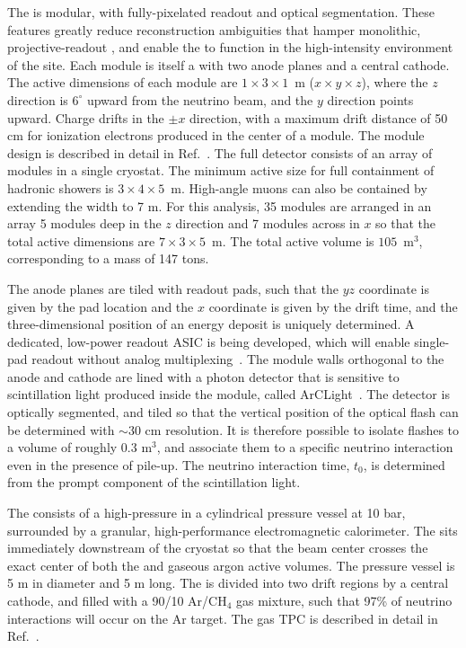 The  is modular, with fully-\threed  pixelated readout and optical segmentation. These features greatly reduce reconstruction ambiguities that hamper monolithic, projective-readout , and enable the  to function in the high-intensity environment of the   site. Each module is itself a   with two anode planes and a central cathode. The active dimensions of each module are $1 \times 3 \times 1$~m ($x \times y \times z$), where the $z$ direction is $6^{\circ}$ upward from the neutrino beam, and the $y$ direction points upward. Charge drifts in the $\pm x$ direction, with a maximum drift distance of 50 cm for ionization electrons produced in the center of a module. The module design is described in detail in Ref.~\cite{Asaadi:2018xfh}. The full  detector consists of an array of modules in a single cryostat. The minimum active size for full containment of hadronic showers is $3 \times 4 \times 5$~m. High-angle muons can also be contained by extending the width to 7 m. For this analysis, 35 modules are arranged in an array 5 modules deep in the $z$ direction and 7 modules across in $x$ so that the total active dimensions are $7 \times 3 \times 5$~m. The total active  volume is $105$~m$^{3}$, corresponding to a mass of 147 tons.

The anode planes are tiled with readout pads, such that the $yz$ coordinate is given by the pad location and the $x$ coordinate is given by the drift time, and the three-dimensional position of an energy deposit is uniquely determined. A dedicated, low-power readout ASIC is being developed, which will enable single-pad readout without analog multiplexing~\cite{Dwyer:2018phu}. The module walls orthogonal to the anode and cathode are lined with a photon detector that is sensitive to scintillation light produced inside the module, called ArCLight~\cite{Auger:2017flc}. The detector is optically segmented, and tiled so that the vertical position of the optical flash can be determined with $\sim$30 cm resolution. It is therefore possible to isolate flashes to a volume of roughly 0.3 m$^{3}$, and associate them to a specific neutrino interaction even in the presence of pile-up. The neutrino interaction time, $t_{0}$, is determined from the prompt component of the scintillation light.

The  consists of a high-pressure  in a cylindrical pressure vessel at 10 bar, surrounded by a granular, high-performance electromagnetic calorimeter. The  sits immediately downstream of the  cryostat so that the beam center crosses the exact center of both the  and gaseous argon active volumes. The pressure vessel is 5 m in diameter and 5 m long. The  is divided into two drift regions by a central cathode, and filled with a 90/10 Ar/CH$_{4}$ gas mixture, such that 97\% of neutrino interactions will occur on the Ar target. The gas TPC is described in detail in Ref.~\cite{bib:docdb12388}.

